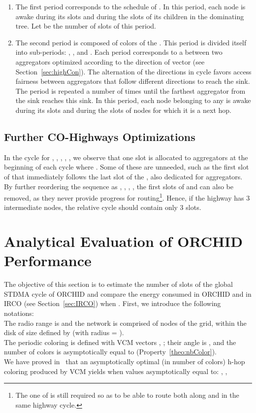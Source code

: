 \begin{enumerate}
\item The first period  corresponds to the schedule 
of . In this period, each node is awake during its slots and during the slots of its children in the dominating tree. Let  be the number of slots of this period.
\item The second period  is composed of colors of the . This period is divided itself into  sub-periods: , ,  and . Each period  corresponds to a  between two aggregators optimized according to the direction of vector  (see Section~\ref{sec:highCon}). The alternation of the  directions in  cycle favors access fairness between aggregators that follow different directions to reach the sink. 
The period  is repeated a number of times until the farthest aggregator from the sink reaches this sink. In this period, each node belonging to any  is awake during its slots and during the slots of nodes for which it is a next hop. \end{enumerate}


\subsection{Further CO-Highways Optimizations}\label{sec:highway-opt}
In the cycle for , , , , , we observe
that one slot is allocated to aggregators at the beginning of each  cycle where 
. Some of these are unneeded, such as the first slot of  
that immediately follows the last slot of the , also dedicated for
aggregators.
By further reordering the  sequence as , , , ,
the first slots of  and  can also be 
removed, as they never provide progress for routing\footnote{The one of  is still required so as to be able to route both along  and  in the same highway cycle.}. Hence, if the highway  has 3 intermediate nodes, the relative cycle should contain only 3 slots.



\section{Analytical Evaluation of ORCHID Performance} \label{sec:results}
The objective of this section is to estimate the number of slots of the global STDMA cycle of ORCHID and compare the  energy consumed in ORCHID and in IRCO 
(see Section~\ref{sec:IRCO}) when .
First, we introduce the following notations: \\
 The radio range is  and the network is comprised of nodes of the grid, within the disk of size defined by  (with radius = ). \\
 The periodic coloring is defined with VCM vectors , ; their angle
  is , and the number of colors is asymptotically equal to  (Property~\ref{theo:nbColor}). \\
 We have proved in~\cite{VCM} that an asymptotically optimal (in number of colors) h-hop coloring produced by VCM yields 
  when   values asymptotically equal to: 
  , 
  , 


